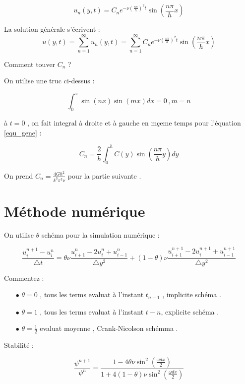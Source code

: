 \documentclass[a4paper,10pt]{report} %
\begin{document}
$$u_n(y,t) =C_ne^{-\nu(\frac{n\pi}{h})^2t}\sin(\frac{n\pi}{h}x)$$

La solution générale s'écrivent :
\begin{equation}
u(y,t)=\sum\limits_{n=1}^{\infty}u_n(y,t)=\sum\limits_{n=1}^{\infty}C_ne^{-\nu(\frac{n\pi}{h})^2t}\sin(\frac{n\pi}{h}x)
\label{equ_gene}
\end{equation}

Comment touver $C_n$ ? 

On utilise une truc ci-dessus :

$$\int_0^\pi\sin(nx)\sin(mx)dx=0 \, , m=n $$

à $t=0$ , on fait integral à droite et à gauche en mçeme temps pour l'équation \ref{equ_gene} :

\begin{equation}
C_n=\frac{2}{h}\int_0^hC(y)\sin(\frac{n\pi}{h}y)dy
\end{equation}

On prend $C_n=\frac{4Gh^2}{k^3\pi^3\nu} $ pour la partie suivante .





\chapter{Méthode numérique}
On utilise $\theta$ schéma pour la simulation numérique :

\begin{equation}
\frac{u_i^{n+1}-u_i^n}{\triangle t}=\theta\nu\frac{u_{i+1}^{n}-2u_i^n+u_{i-1}^n}{\triangle y^2}+(1-\theta)\nu\frac{u_{i+1}^{n+1}-2u_i^{n+1}+u_{i-1}^{n+1}}{\triangle y^2}
\end{equation}

Commentez :

\begin{itemize}
    \item[$\bullet$] $\theta=0$ , tous les terms evaluat à l'instant $t_{n+1}$ , implicite schéma .
    \item[$\bullet$]$\theta=1$ , tous les terms evaluat à l'instant $t-{n}$, explicite schéma .
    \item[$\bullet$]$\theta=\frac{1}{2} $ evaluat moyenne , Crank-Nicolson schémma .
\end{itemize}

Stabilité :

$$\frac{\psi^{n+1}}{\psi^n}=\frac{1-4\theta\nu\sin^2(\frac{\omega dx}{2})}{1+4(1-\theta)\nu\sin^2(\frac{\omega dx}{2})}$$
\end{document}
